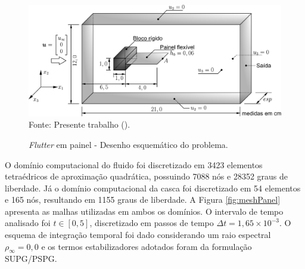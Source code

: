 \begin{figure}[h!]
    \centering
    \caption{\textit{Flutter} em painel - Desenho esquemático do problema.}
    \includegraphics[width=\linewidth]{Figuras/FSI-prism/FSI-prism3D.pdf}
    \\Fonte: Presente trabalho (\the\year).
    \label{fig:FSI-prism}
\end{figure}


O domínio computacional do fluido foi discretizado em 3423 elementos tetraédricos de aproximação quadrática, possuindo 7088 nós e 28352 graus de liberdade. Já o domínio computacional da casca foi discretizado em 54 elementos e 165 nós, resultando em 1155 graus de liberdade. A Figura \ref{fig:meshPanel} apresenta as malhas utilizadas em ambos os domínios. O intervalo de tempo analisado foi $t\in[0,5]$, discretizado em passos de tempo $\Delta t=1,65\times10^{-3}$. O esquema de integração temporal foi dado considerando um raio espectral $\rho_\infty=0,0$ e os termos estabilizadores adotados foram da formulação SUPG/PSPG.

